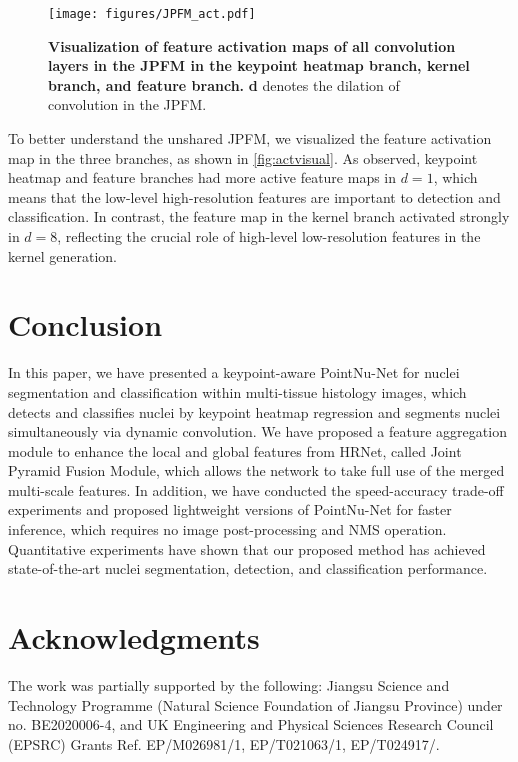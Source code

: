 \documentclass[lettersize,journal]{IEEEtran}
\begin{document}
\begin{figure}[t]
\centering
\texttt{[image: figures/JPFM\_act.pdf]}
\caption{\textbf{Visualization of feature activation maps of all convolution layers in the JPFM in the keypoint heatmap branch, kernel branch, and feature branch.} \textbf{d} denotes the dilation of convolution in the JPFM. }
\label{fig:actvisual}
\end{figure}
To better understand the unshared JPFM, we visualized the feature activation map in the three branches, as shown in \autoref{fig:actvisual}. As observed, keypoint heatmap and feature branches had more active feature maps in $d=1$, which means that the low-level high-resolution features are important to detection and classification. In contrast, the feature map in the kernel branch activated strongly in $d=8$, reflecting the crucial role of high-level low-resolution features in the kernel generation.

\section{Conclusion}
In this paper, we have presented a keypoint-aware PointNu-Net for nuclei segmentation and classification within multi-tissue histology images, which detects and classifies nuclei by keypoint heatmap regression and segments nuclei simultaneously via dynamic convolution. 
We have proposed a feature aggregation module to enhance the local and global features from HRNet, called Joint Pyramid Fusion Module, which allows the network to take full use of the merged multi-scale features. In addition, we have conducted the speed-accuracy trade-off experiments and proposed lightweight versions of PointNu-Net for faster inference, which requires no image post-processing and NMS operation. 
Quantitative experiments have shown that our proposed method has achieved state-of-the-art nuclei segmentation, detection, and classification performance.



\section*{Acknowledgments}
The work was partially supported by the following: Jiangsu Science and Technology Programme (Natural Science Foundation of Jiangsu Province) under no. BE2020006-4, and UK Engineering and Physical Sciences Research Council (EPSRC) Grants Ref. EP/M026981/1, EP/T021063/1, EP/T024917/.


\end{document}
